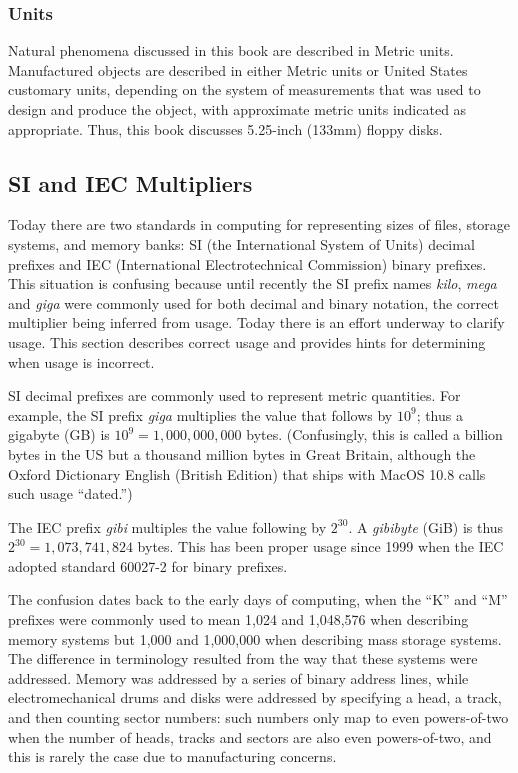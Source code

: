 \subsubsection{Units}

Natural phenomena discussed in this book are described in Metric
units. Manufactured objects are described in either Metric units or
United States customary units, depending on the system of measurements
that was used to design and produce the object, with approximate
metric units indicated as appropriate. Thus, this book
discusses 5.25-inch (133mm) floppy disks.

\subsection{SI and IEC Multipliers}\label{sec:si-and-iec}

Today there are two standards in computing for representing sizes of
files, storage systems, and memory banks: SI (the International System
of Units) decimal prefixes and IEC (International Electrotechnical
Commission) binary prefixes. This situation is confusing because until
recently the SI prefix names \emph{kilo}, \emph{mega} and \emph{giga} were commonly used
for both decimal and binary notation, the correct multiplier being
inferred from usage. Today there is an effort underway to clarify
usage. This section describes correct usage and provides hints for
determining when usage is incorrect.

SI decimal prefixes are commonly used to represent metric
quantities. For example, the SI prefix \emph{giga} multiplies the value that follows by
$10^9$; thus a gigabyte (GB) is
$10^9=1,000,000,000$ bytes. (Confusingly, this is called a billion bytes
in the US but a thousand million bytes in Great Britain, although the
Oxford Dictionary English (British Edition) that ships with MacOS 10.8
calls such usage ``dated.'')

The IEC prefix \emph{gibi} multiples the value following by $2^{30}$. A \emph{gibibyte}
(GiB) is thus $2^{30}=1,073,741,824$ bytes. This has been proper usage
since 1999 when the IEC adopted standard 60027-2 for binary prefixes.

The confusion dates back to the early days of computing, when the ``K''
and ``M'' prefixes were commonly used to mean 1,024 and 1,048,576
when describing memory systems but 1,000 and 1,000,000 when
describing mass storage systems. The difference in terminology resulted
from the way that these systems were addressed. Memory was addressed
by a series of binary address lines, while electromechanical drums and
disks were addressed by specifying a head, a track, and then counting
sector numbers: such numbers only map to even powers-of-two when the
number of heads, tracks and sectors are also even powers-of-two, and
this is rarely the case due to manufacturing concerns.

